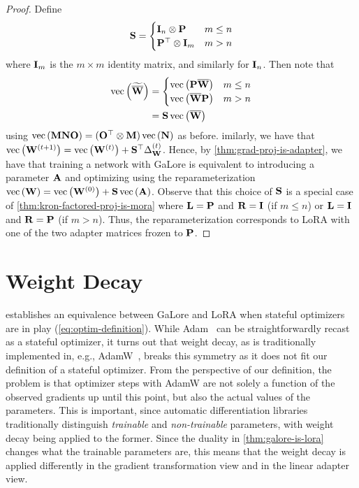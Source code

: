 \begin{proof}
Define 
\begin{align*}
{\mathbf{S}} = \begin{cases}
    {\mathbf{I}}_n \otimes {\mathbf{P}} & m \le n \\
    {\mathbf{P}}^\top \otimes {\mathbf{I}}_m & m > n \\
\end{cases}
\end{align*}
where ${\mathbf{I}}_m$ is the $m \times m$ identity matrix, and similarly for ${\mathbf{I}}_n$.
Then note that 
\begin{align*}
\operatorname{vec}\left(\widetilde{\overline{{\mathbf{W}}}}\right) &= \begin{cases}
    \operatorname{vec}\left(\mathbf{P} \overline{{\mathbf{W}}}\right) & m \le n \\
    \operatorname{vec}\left(\overline{{\mathbf{W}}} {\mathbf{P}}\right) & m > n \\
\end{cases} \\
&= {\mathbf{S}} \operatorname{vec}\left(\overline{{\mathbf{W}}}\right)
\end{align*}
using $\operatorname{vec}\left({\mathbf{M}} {\mathbf{N}} {\mathbf{O}}\right) = ({\mathbf{O}}^\top \otimes {\mathbf{M}}) \operatorname{vec}\left({\mathbf{N}}\right)$ as before.
imilarly, we have that $\operatorname{vec}\left({\mathbf{W}}^{(t+1)}\right) = \operatorname{vec}\left({\mathbf{W}}^{(t)}\right) + {\mathbf{S}}^\top \Delta_{{\mathbf{W}}}^{(t)}$. Hence, by \cref{thm:grad-proj-is-adapter}, we have that training a network with GaLore is equivalent to introducing a parameter ${\mathbf{A}}$ and optimizing using the reparameterization $\operatorname{vec}\left({\mathbf{W}}\right) = \operatorname{vec}\left({\mathbf{W}}^{(0)}\right) + {\mathbf{S}} \operatorname{vec}\left({\mathbf{A}}\right)$.
Observe that this choice of ${\mathbf{S}}$ is a special case of \cref{thm:kron-factored-proj-is-mora} where ${\mathbf{L}} = {\mathbf{P}}$ and ${\mathbf{R}} = {\mathbf{I}}$ (if $m \le n$) or ${\mathbf{L}} = {\mathbf{I}}$ and ${\mathbf{R}} = {\mathbf{P}}$ (if $m > n$).
Thus, the reparameterization corresponds to LoRA with one of the two adapter matrices frozen to ${\mathbf{P}}$.
\end{proof}


\section{Weight Decay}
\label{app:weight-decay}

 establishes an equivalence between GaLore and LoRA when stateful optimizers are in play (\cref{eq:optim-definition}).
While Adam~\citep{adam} can be straightforwardly recast as a stateful optimizer, it turns out that weight decay, as is traditionally implemented in, e.g., AdamW~\citep{adamw}, breaks this symmetry as it does not fit our definition of a stateful optimizer.
From the perspective of our definition, the problem is that optimizer steps with AdamW are not solely a function of the observed gradients up until this point, but also the actual values of the parameters.
This is important, since automatic differentiation libraries traditionally distinguish \emph{trainable} and \emph{non-trainable} parameters, with weight decay being applied to the former.
Since the duality  in \cref{thm:galore-is-lora} changes what the trainable parameters are, this means that the weight decay is applied differently in the gradient transformation view and in the linear adapter view.

